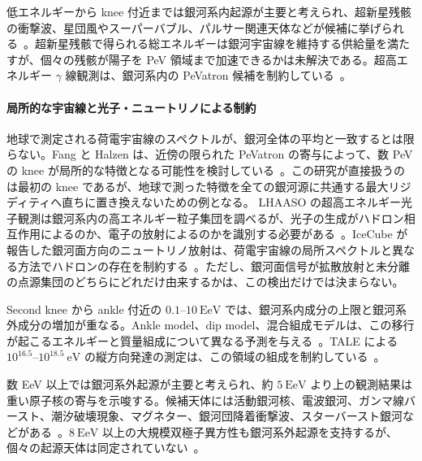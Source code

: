 \documentclass[book,paper=a4,fontsize=11pt]{jlreq}
\begin{document}
低エネルギーから knee 付近までは銀河系内起源が主要と考えられ、超新星残骸の衝撃波、星団風やスーパーバブル、パルサー関連天体などが候補に挙げられる~\cite{Gabici2019,PDGCosmicRays}。超新星残骸で得られる総エネルギーは銀河宇宙線を維持する供給量を満たすが、個々の残骸が陽子を PeV 領域まで加速できるかは未解決である。超高エネルギー \(\gamma\) 線観測は、銀河系内の PeVatron 候補を制約している~\cite{Cao2023}。

\paragraph{局所的な宇宙線と光子・ニュートリノによる制約}
地球で測定される荷電宇宙線のスペクトルが、銀河全体の平均と一致するとは限らない。Fang と Halzen は、近傍の限られた PeVatron の寄与によって、数 PeV の knee が局所的な特徴となる可能性を検討している~\cite{Fang2026LocalKnee}。この研究が直接扱うのは最初の knee であるが、地球で測った特徴を全ての銀河源に共通する最大リジディティへ直ちに置き換えないための例となる。
LHAASO の超高エネルギー光子観測は銀河系内の高エネルギー粒子集団を調べるが、光子の生成がハドロン相互作用によるのか、電子の放射によるのかを識別する必要がある~\cite{Cao2023}。IceCube が報告した銀河面方向のニュートリノ放射は、荷電宇宙線の局所スペクトルと異なる方法でハドロンの存在を制約する~\cite{IceCubeGalacticPlane2023}。ただし、銀河面信号が拡散放射と未分離の点源集団のどちらにどれだけ由来するかは、この検出だけでは決まらない。

Second knee から ankle 付近の \(0.1\)--\(10\ \mathrm{EeV}\) では、銀河系内成分の上限と銀河系外成分の増加が重なる。Ankle model、dip model、混合組成モデルは、この移行が起こるエネルギーと質量組成について異なる予測を与える~\cite{Cristofari2023,PDGCosmicRays}。TALE による \(10^{16.5}\)--\(10^{18.5}\ \mathrm{eV}\) の縦方向発達の測定は、この領域の組成を制約している~\cite{TALEMassComposition2026}。

数 EeV 以上では銀河系外起源が主要と考えられ、約 \(5\ \mathrm{EeV}\) より上の観測結果は重い原子核の寄与を示唆する。候補天体には活動銀河核、電波銀河、ガンマ線バースト、潮汐破壊現象、マグネター、銀河団降着衝撃波、スターバースト銀河などがある~\cite{GlobusBlandford2023}。\(8\ \mathrm{EeV}\) 以上の大規模双極子異方性も銀河系外起源を支持するが、個々の起源天体は同定されていない~\cite{AugerDipole2017,AugerTA2023ArrivalDirections}。
\end{document}
